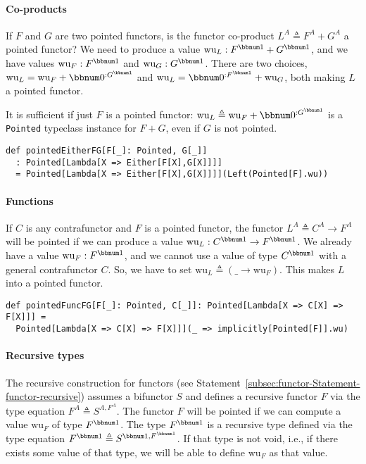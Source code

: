 \paragraph{Co-products}

If $F$ and $G$ are two pointed functors, is the functor co-product
$L^{A}\triangleq F^{A}+G^{A}$ a pointed functor? We need to produce
a value $\text{wu}_{L}:F^{\bbnum 1}+G^{\bbnum 1}$, and we have values
$\text{wu}_{F}:F^{\bbnum 1}$ and $\text{wu}_{G}:G^{\bbnum 1}$. There
are two choices, $\text{wu}_{L}=\text{wu}_{F}+\bbnum 0^{:G^{\bbnum 1}}$
and $\text{wu}_{L}=\bbnum 0^{:F^{\bbnum 1}}+\text{wu}_{G}$, both
making $L$ a pointed functor. 

It is sufficient if just $F$ is a pointed functor: $\text{wu}_{L}\triangleq\text{wu}_{F}+\bbnum 0^{:G^{\bbnum 1}}$
is a \lstinline!Pointed! typeclass instance for $F+G$, even if $G$
is not pointed.
\begin{lstlisting}
def pointedEitherFG[F[_]: Pointed, G[_]]
  : Pointed[Lambda[X => Either[F[X],G[X]]]]
  = Pointed[Lambda[X => Either[F[X],G[X]]]](Left(Pointed[F].wu))
\end{lstlisting}


\paragraph{Functions}

If $C$ is any contrafunctor and $F$ is a pointed functor, the functor
$L^{A}\triangleq C^{A}\rightarrow F^{A}$ will be pointed if we can
produce a value $\text{wu}_{L}:C^{\bbnum 1}\rightarrow F^{\bbnum 1}$.
We already have a value $\text{wu}_{F}:F^{\bbnum 1}$, and we cannot
use a value of type $C^{\bbnum 1}$ with a general contrafunctor $C$.
So, we have to set $\text{wu}_{L}\triangleq(\_\rightarrow\text{wu}_{F})$.
This makes $L$ into a pointed functor.
\begin{lstlisting}
def pointedFuncFG[F[_]: Pointed, C[_]]: Pointed[Lambda[X => C[X] => F[X]]] =
  Pointed[Lambda[X => C[X] => F[X]]](_ => implicitly[Pointed[F]].wu)
\end{lstlisting}


\paragraph{Recursive types}

The recursive construction for functors (see Statement~\ref{subsec:functor-Statement-functor-recursive})
assumes a bifunctor $S$ and defines a recursive functor $F$ via
the type equation $F^{A}\triangleq S^{A,F^{A}}$. The functor $F$
will be pointed if we can compute a value $\text{wu}_{F}$ of type
$F^{\bbnum 1}$. The type $F^{\bbnum 1}$ is a recursive type defined
via the type equation $F^{\bbnum 1}\triangleq S^{\bbnum 1,F^{\bbnum 1}}$.
If that type is not void, i.e., if there exists some value of that
type, we will be able to define $\text{wu}_{F}$ as that value. 

